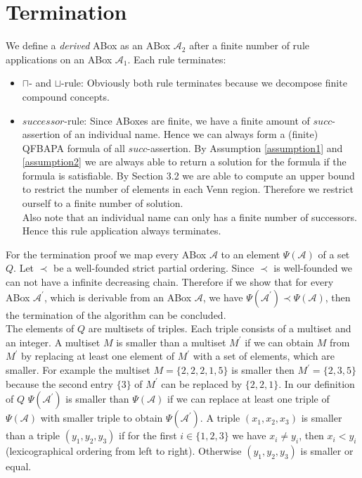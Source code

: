 \documentclass{book}
\theoremstyle{break}
\theoremstyle{definition}
\begin{document}
\section{Termination}
We define a \textit{derived} ABox as an ABox $\mathcal{A}_2$ after a finite number of rule applications on an ABox $\mathcal{A}_1$. Each rule terminates:
\begin{itemize}
\item $\sqcap$- and $\sqcup$-rule: Obviously both rule terminates because we decompose finite compound concepts.
\item $successor$-rule: Since ABoxes are finite, we have a finite amount of $succ$-assertion of an individual name. Hence we can always form a (finite) QFBAPA formula of all $succ$-assertion. By Assumption \ref{assumption1} and \ref{assumption2} we are always able to return a solution for the formula if the formula is satisfiable. By Section 3.2 we are able to compute an upper bound to restrict the number of elements in each Venn region. Therefore we restrict ourself to a finite number of solution.\\
Also note that an individual name can only has a finite number of successors. Hence this rule application always terminates.
\end{itemize}
For the termination proof we map every ABox $\mathcal{A}$ to an element $\Psi(\mathcal{A})$ of a set $Q$. Let $\prec$ be a well-founded strict partial ordering. Since $\prec$ is well-founded we can not have a infinite decreasing chain. Therefore if we show that for every ABox $\mathcal{A}^\prime$, which is derivable from an ABox $\mathcal{A}$, we have $\Psi(\mathcal{A}^\prime)\prec\Psi(\mathcal{A})$, then the termination of the algorithm can be concluded.\\
The elements of $Q$ are multisets of triples. Each triple consists of a multiset and an integer. A multiset $M$ is smaller than a multiset $M^\prime$ if we can obtain $M$ from $M^\prime$ by replacing at least one element of $M^\prime$ with a set of elements, which are smaller. For example the multiset $M=\{2,2,2,1,5\}$ is smaller then $M^\prime=\{2,3,5\}$ because the second entry $\{3\}$ of $M^\prime$ can be replaced by $\{2,2,1\}$. In our definition of $Q$ $\Psi(\mathcal{A}^\prime)$ is smaller than $\Psi(\mathcal{A})$ if we can replace at least one triple of $\Psi(\mathcal{A})$ with smaller triple to obtain $\Psi(\mathcal{A}^\prime)$. A triple $(x_1,x_2, x_3)$ is smaller than a triple $(y_1,y_2,y_3)$ if for the first $i\in\{1,2,3\}$ we have $x_i\neq y_i$, then $x_i<y_i$ (lexicographical ordering from left to right). Otherwise $(y_1,y_2,y_3)$ is smaller or equal.\\
\end{document}
